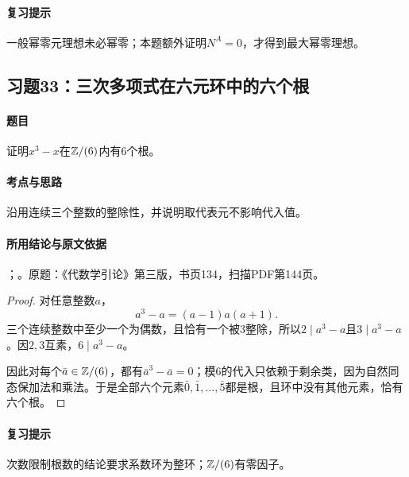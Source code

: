 \paragraph{复习提示}

一般幂零元理想未必幂零；本题额外证明$N^A=0$，才得到最大幂零理想。



\subsection{习题33：三次多项式在六元环中的六个根}

\label{ex:3:33}

\paragraph{题目}

证明$x^3-x$在$\mathbb Z/(6)$内有$6$个根。

\paragraph{考点与思路}

沿用连续三个整数的整除性，并说明取代表元不影响代入值。

\paragraph{所用结论与原文依据}

；。原题：《代数学引论》第三版，书页134，扫描PDF第144页。


\begin{proof}

对任意整数$a$，
\[
a^3-a=(a-1)a(a+1).
\]
三个连续整数中至少一个为偶数，且恰有一个被$3$整除，所以$2\mid a^3-a$且$3\mid a^3-a$。因$2,3$互素，$6\mid a^3-a$。

因此对每个$\bar a\in\mathbb Z/(6)$，都有$\bar a^3-\bar a=0$；模$6$的代入只依赖于剩余类，因为自然同态保加法和乘法。于是全部六个元素$\bar0,\bar1,\ldots,\bar5$都是根，且环中没有其他元素，恰有六个根。

\end{proof}

\paragraph{复习提示}

次数限制根数的结论要求系数环为整环；$\mathbb Z/(6)$有零因子。



